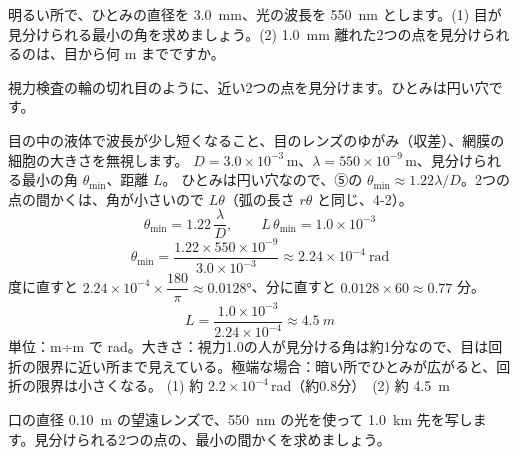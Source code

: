 \begin{phreidai}[目で見分けられる限界]
\label{ph:波-13:ex9}明るい所で、ひとみの直径を \qty{3.0}{mm}、光の波長を \qty{550}{nm} とします。(1) 目が見分けられる最小の角を求めましょう。(2) \qty{1.0}{mm} 離れた2つの点を見分けられるのは、目から何 m までですか。
\phbamen
\noindent\begin{minipage}[c]{0.56\linewidth}\raggedright
視力検査の輪の切れ目のように、近い2つの点を見分けます。ひとみは円い穴です。
\end{minipage}\hfill
\begin{minipage}[c]{0.4\linewidth}\centering
{}
\end{minipage}
\phmushi
目の中の液体で波長が少し短くなること、目のレンズのゆがみ（収差）、網膜の細胞の大きさを無視します。
\phzu
$D=3.0\times10^{-3}$\,m、$\lambda=550\times10^{-9}$\,m、見分けられる最小の角 $\theta_{\min}$、距離 $L$。
\phriyu
ひとみは円い穴なので、⑤の $\theta_{\min}\approx1.22\lambda/D$。2つの点の間かくは、角が小さいので $L\theta$（弧の長さ $r\theta$ と同じ、4-2）。
\phtateru
\[ \theta_{\min}=1.22\,\frac{\lambda}{D},\qquad L\,\theta_{\min}=1.0\times10^{-3} \]
\phtoku
\[ \theta_{\min}=\frac{1.22\times550\times10^{-9}}{3.0\times10^{-3}}\approx2.24\times10^{-4}\ \mathrm{rad} \]
度に直すと $2.24\times10^{-4}\times\dfrac{180}{\pi}\approx0.0128°$、分に直すと $0.0128\times60\approx0.77$ 分。
\[ L=\frac{1.0\times10^{-3}}{2.24\times10^{-4}}\approx\qty{4.5}{m} \]
\phtashikame
単位：m÷m で rad。大きさ：視力1.0の人が見分ける角は約1分なので、目は回折の限界に近い所まで見えている。極端な場合：暗い所でひとみが広がると、回折の限界は小さくなる。
\kotae (1) 約 $2.2\times10^{-4}$\,rad（約0.8分）　(2) 約 \qty{4.5}{m}
\end{phreidai}
\begin{jibun}
口の直径 \qty{0.10}{m} の望遠レンズで、\qty{550}{nm} の光を使って \qty{1.0}{km} 先を写します。見分けられる2つの点の、最小の間かくを求めましょう。
\end{jibun}

